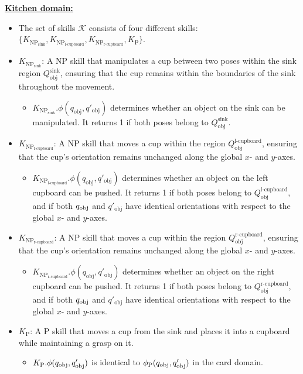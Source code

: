 \underline{\textbf{Kitchen domain:}} \label{env:kitchen_skill_descript}
\begin{itemize}
        \item[] The set of skills \(\mathcal{K}\) consists of four different skills: \(\{ K_{\text{NP}_\text{sink}}, K_{\text{NP}_\text{l-cupboard}}, K_{\text{NP}_\text{r-cupboard}}, K_\text{P}\}\). \label{skill:kitchen_library}
        \item \(K_{\text{NP}_\text{sink}}\): A NP skill that manipulates a cup between two poses within the sink region \(Q_\text{obj}^\text{sink}\), ensuring that the cup remains within the boundaries of the sink throughout the movement. \label{skill:kitchen_sink}
        \begin{itemize}
            \item \( K_{\text{NP}_\text{sink}}.\phi(q_{\text{obj}}, q'_{\text{obj}}) \) determines whether an object on the sink can be manipulated. It returns 1 if both poses belong to \( Q_{\text{obj}}^{\text{sink}} \).
        \end{itemize}
        \item \(K_{\text{NP}_\text{l-cupboard}}\): A NP skill that moves a cup within the region \(Q_\text{obj}^\text{l-cupboard}\), ensuring that the cup's orientation remains unchanged along the global \( x \)- and \( y \)-axes. \label{skill:kitchen_lcupboard}
        \begin{itemize}
            \item \( K_{\text{NP}_\text{l-cupboard}}.\phi(q_{\text{obj}}, q'_{\text{obj}}) \) determines whether an object on the left cupboard can be pushed. It returns 1 if both poses belong to \( Q^\text{l-cupboard}_{\text{obj}} \), and if both $q_\text{obj}$ and $q'_\text{obj}$ have identical orientations with respect to the global \( x \)- and \( y \)-axes.
        \end{itemize}
        \item \(K_{\text{NP}_\text{r-cupboard}}\): A NP skill that moves a cup within the region \(Q_\text{obj}^\text{r-cupboard}\), ensuring that the cup's orientation remains unchanged along the global \( x \)- and \( y \)-axes. \label{skill:kitchen_rcupboard}
        \begin{itemize}
            \item \( K_{\text{NP}_\text{r-cupboard}}.\phi(q_{\text{obj}}, q'_{\text{obj}}) \) determines whether an object on the right cupboard can be pushed. It returns 1 if both poses belong to \( Q^\text{r-cupboard}_{\text{obj}} \), and if both $q_\text{obj}$ and $q'_\text{obj}$ have identical orientations with respect to the global \( x \)- and \( y \)-axes.
        \end{itemize}
        \item \(K_\text{P}\): A P skill that moves a cup from the sink and places it into a cupboard while maintaining a grasp on it. \label{skill:kitchen_place}
        \begin{itemize}
            \item \( K_\text{P}.\phi(q_\text{obj}, q_\text{obj}') \) is identical to \( \phi_\text{P}(q_\text{obj}, q_\text{obj}') \) in the card domain.
        \end{itemize}
    \end{itemize}

